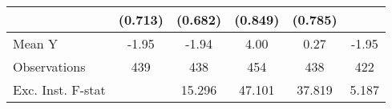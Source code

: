 {\begin{tabular}{l*{5}{c}}
            &     (0.713)         &     (0.682)         &     (0.849)         &     (0.785)         &                     \\
\midrule
Mean Y      &       -1.95         &       -1.94         &        4.00         &        0.27         &       -1.95         \\
Observations&         439         &         438         &         454         &         438         &         422         \\
Exc. Inst. F-stat&                     &      15.296         &      47.101         &      37.819         &       5.187         \\
\bottomrule
\end{tabular}
}
